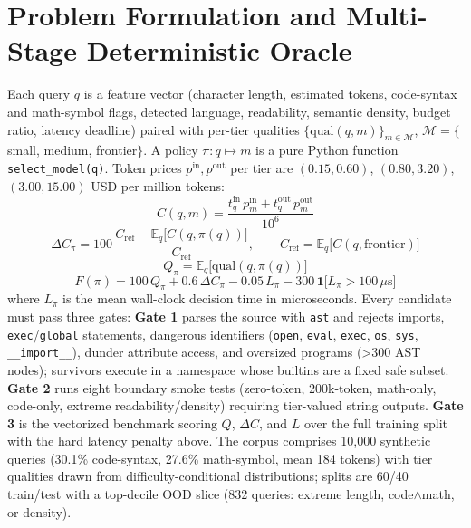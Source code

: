 \documentclass[11pt]{article}
\begin{document}
\section{Problem Formulation and Multi-Stage Deterministic Oracle}
Each query $q$ is a feature vector (character length, estimated tokens, code-syntax and math-symbol flags, detected language, readability, semantic density, budget ratio, latency deadline) paired with per-tier qualities $\{\mathrm{qual}(q,m)\}_{m \in \mathcal{M}}$, $\mathcal{M}=\{$small, medium, frontier$\}$. A policy $\pi: q \mapsto m$ is a pure Python function \texttt{select\_model(q)}. Token prices $p^{\mathrm{in}},p^{\mathrm{out}}$ per tier are $(0.15,0.60)$, $(0.80,3.20)$, $(3.00,15.00)$ USD per million tokens:
\begin{equation}
  C(q,m)=\frac{t^{\mathrm{in}}_q\,p^{\mathrm{in}}_m + t^{\mathrm{out}}_q\,p^{\mathrm{out}}_m}{10^{6}}
  \label{eq:cost}
\end{equation}
\begin{equation}
  \Delta C_\pi = 100\,\frac{C_{\mathrm{ref}}-\mathbb{E}_q\big[C(q,\pi(q))\big]}{C_{\mathrm{ref}}}, \qquad C_{\mathrm{ref}}=\mathbb{E}_q\big[C(q,\mathrm{frontier})\big]
  \label{eq:costreduction}
\end{equation}
\begin{equation}
  Q_\pi = \mathbb{E}_q\big[\mathrm{qual}(q,\pi(q))\big]
  \label{eq:quality}
\end{equation}
\begin{equation}
  F(\pi) = 100\,Q_\pi + 0.6\,\Delta C_\pi - 0.05\,L_\pi - 300\,\mathbf{1}\big[L_\pi > 100\,\mu\mathrm{s}\big]
  \label{eq:fitness}
\end{equation}
where $L_\pi$ is the mean wall-clock decision time in microseconds. Every candidate must pass three gates: \textbf{Gate 1} parses the source with \texttt{ast} and rejects imports, \texttt{exec}/\texttt{global} statements, dangerous identifiers (\texttt{open}, \texttt{eval}, \texttt{exec}, \texttt{os}, \texttt{sys}, \texttt{\_\_import\_\_}), dunder attribute access, and oversized programs (>300 AST nodes); survivors execute in a namespace whose builtins are a fixed safe subset. \textbf{Gate 2} runs eight boundary smoke tests (zero-token, 200k-token, math-only, code-only, extreme readability/density) requiring tier-valued string outputs. \textbf{Gate 3} is the vectorized benchmark scoring $Q$, $\Delta C$, and $L$ over the full training split with the hard latency penalty above. The corpus comprises 10{,}000 synthetic queries (30.1\% code-syntax, 27.6\% math-symbol, mean 184 tokens) with tier qualities drawn from difficulty-conditional distributions; splits are 60/40 train/test with a top-decile OOD slice (832 queries: extreme length, code$\wedge$math, or density).
\end{document}
